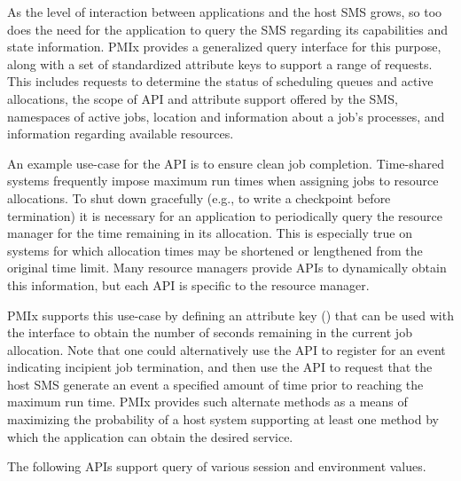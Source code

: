 As the level of interaction between applications and the host \ac{SMS} grows, so too does the need for the application to query the \ac{SMS} regarding its capabilities and state information. \ac{PMIx} provides a generalized query interface for this purpose, along with a set of standardized attribute keys to support a range of requests. This includes requests to determine the status of scheduling queues and active allocations, the scope of \ac{API} and attribute support offered by the \ac{SMS}, namespaces of active jobs, location and information about a job's processes, and information regarding available resources.

An example use-case for the  \ac{API} is to ensure clean job completion. Time-shared systems frequently impose maximum run times when assigning jobs to resource allocations. To shut down gracefully (e.g., to write a checkpoint before termination) it is necessary for an application to periodically query the resource manager for the time remaining in its allocation. This is especially true on systems for which allocation times may be shortened or lengthened from the original time limit. Many resource managers provide \acp{API} to dynamically obtain this information, but each \ac{API} is specific to the resource manager.

\ac{PMIx} supports this use-case by defining an attribute key () that can be used with the  interface to obtain the number of seconds remaining in the current job allocation. Note that one could alternatively use the  \ac{API} to register for an event indicating incipient job termination, and then use the  \ac{API} to request that the host \ac{SMS} generate an event a specified amount of time prior to reaching the maximum run time. \ac{PMIx} provides such alternate methods as a means of maximizing the probability of a host system supporting at least one method by which the application can obtain the desired service.

The following \acp{API} support query of various session and environment values.


\subsection{}

\summary

